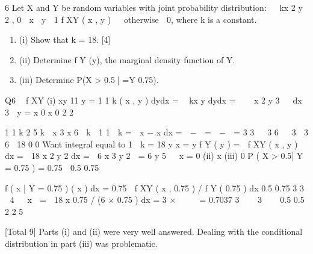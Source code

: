 \documentclass[a4paper,12pt]{article}
\begin{document}
6
Let X and Y be random variables with joint probability distribution:
  kx 2 y 2 , 0  x  y  1
f XY ( x , y )  
otherwise
 0,
where k is a constant.
\begin{enumerate}
\item (i) Show that k = 18. [4]
\item (ii) Determine f Y (y), the marginal density function of Y. 
\item (iii) Determine P(X > 0.5| =Y  0.75).
\end{enumerate}
\newpage
Q6
 f XY
(i)
xy
11
y = 1
1
k
( x , y ) dydx =  kx y dydx =    x 2 y 3   dx
 3
 y = x
0 x
0
2 2

1
1
k 2 5
k  x 3 x 6 
k  1 1  k
=  x − x dx =  −  =  −  =
3
3   3
6  
3  3 6  18
0
0 
Want integral equal to 1  k = 18 
y
x = y
f Y ( y ) =  f XY ( x , y ) dx =  18 x 2 y 2 dx =  6 x 3 y 2 
= 6 y 5

 x = 0
(ii)
x
(iii)
0
P ( X > 0.5| Y = 0.75 ) =
0.75

0.5
0.75

f ( x | Y = 0.75 ) ( x ) dx =
0.75

f XY ( x , 0.75 ) / f Y ( 0.75 ) dx 
0.5
0.75
3
3
 4   x 
=  18 x 0.75 / (6 × 0.75 ) dx = 3 ×    
= 0.7037
3    3  

0.5
0.5
2
2
5

[Total 9]
Parts (i) and (ii) were very well answered. Dealing with the conditional
distribution in part (iii) was problematic.
\end{document}
